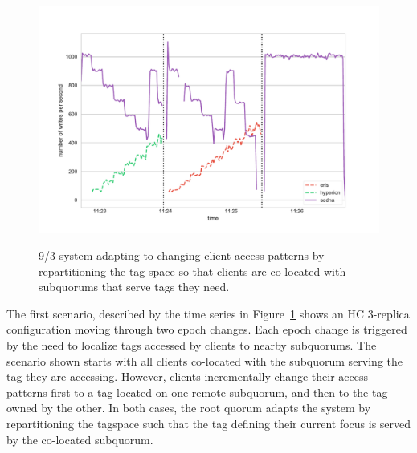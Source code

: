 \begin{figure}
    \begin{center}
        \includegraphics[width=5in]{figures/ch03_umd_sawtooth.pdf}
    \end{center}
    \renewcommand{\baselinestretch}{1}
    \small\normalsize

    \begin{quote}
        \caption[Sawtooth Graph]{9/3 system adapting to changing client access patterns by repartitioning the tag space so that clients are co-located with subquorums that serve tags they need.}
        \label{fig:ch03_umd_sawtooth}
    \end{quote}
\end{figure}
\renewcommand{\baselinestretch}{2}
\small\normalsize

The first scenario, described by the time series in Figure~\ref{fig:ch03_umd_sawtooth} shows an HC 3-replica configuration moving through two epoch changes.
Each epoch change is triggered by the need to localize tags accessed by
clients to nearby subquorums.
The scenario shown starts with all clients co-located with the subquorum serving the tag they are accessing.
However, clients incrementally change their access patterns first to a tag located on one remote subquorum, and then to the tag owned by the other.
In both cases, the root quorum adapts the system by repartitioning the tagspace such that the tag defining their current focus is served by the co-located subquorum.

